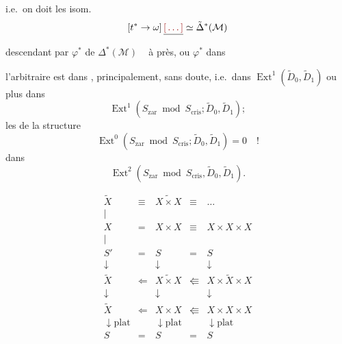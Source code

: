 \documentclass[11pt,a4paper]{article}
\begin{document}
i.e.\ on doit   les isom.
\[
[t^* \to \omega]\,\struck{\ill{}} \simeq \tilde{\Delta}^*(\mathcal{M})
\]
descendant \struck{\ill{}}  \ill{} par $\varphi^*$ de
$\Delta^*(\mathcal{M})$ \ill{} \ \ill{} à \ill{} près, ou
\ill{} $\varphi^*$ dans

l'arbitraire est dans \ill{} \ill{}, \ill{} principalement, sans doute,
i.e.\ dans $\operatorname{Ext}^1(\tilde D_0, \tilde D_1)$ ou plus
\ill{} dans
\[
\operatorname{Ext}^1(S_{\mathrm{zar}} \bmod S_{\mathrm{cris}};
\tilde D_0, \tilde D_1) ;
\]
les  de la structure \ill{} \ill{}
\[
\operatorname{Ext}^0(S_{\mathrm{zar}} \bmod S_{\mathrm{cris}};
\tilde D_0, \tilde D_1) = 0 \quad !
\]
dans
\[
\operatorname{Ext}^2(S_{\mathrm{zar}} \bmod S_{\mathrm{cris}},
\tilde D_0, \tilde D_1) .
\]

\[
\begin{array}{ccccc}
\tilde{X} & \equiv & \widetilde{X \times X} & \equiv & \ldots \\
| & & & & \\
X & = & X \times X & \equiv & X \times X \times X \\
| & & & & \\
S' & = & S & = & S \\
\downarrow & & \downarrow & & \downarrow \\
\tilde{X} & \Leftarrow & \widetilde{X \times X} & \Lleftarrow & \widetilde{X \times X \times X} \\
\downarrow & & \downarrow & & \downarrow \\
\tilde{X} & \Leftarrow & X \times X & \Lleftarrow & X \times X \times X \\
\downarrow \mathrm{plat} & & \downarrow \mathrm{plat} & & \downarrow \mathrm{plat} \\
S & = & S & = & S
\end{array}
\]
\end{document}
